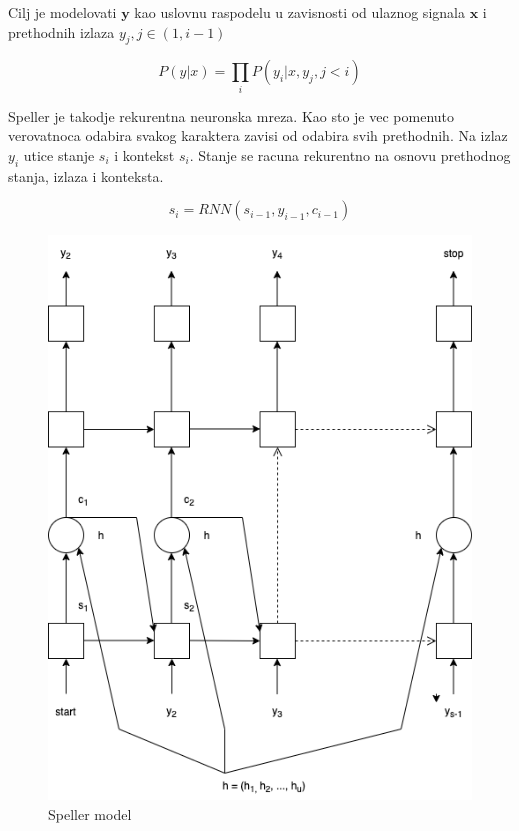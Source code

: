 \documentclass[a4paper]{article}
\begin{document}
\bigskip
Cilj je modelovati $\textbf{y}$ kao uslovnu raspodelu u zavisnosti od ulaznog signala $\textbf{x}$ i prethodnih izlaza $y_j,  j \in (1,  i-1)$

\begin{equation}
\label{eq:chain}
P(y | x) = \prod_i P(y_i | x,  y_j,  j < i)
\end{equation}

\bigskip

Speller je takodje rekurentna neuronska mreza.  Kao sto je vec pomenuto verovatnoca odabira svakog karaktera zavisi od odabira svih prethodnih.  Na izlaz $y_i$ utice stanje $s_i$ i kontekst $s_i$.  Stanje se racuna rekurentno na osnovu prethodnog stanja,  izlaza i konteksta.

 \begin{equation}
\label{eq:state}
s_i = RNN (s_{i-1},  y_{i-1},  c_{i-1})
\end{equation}

\begin{figure}[h!]
  \begin{center}
    \includegraphics[scale=0.3]{speller.png}
  \end{center}
  \caption{Speller model}
  \label{fig:speller_model}
\end{figure}
\end{document}
